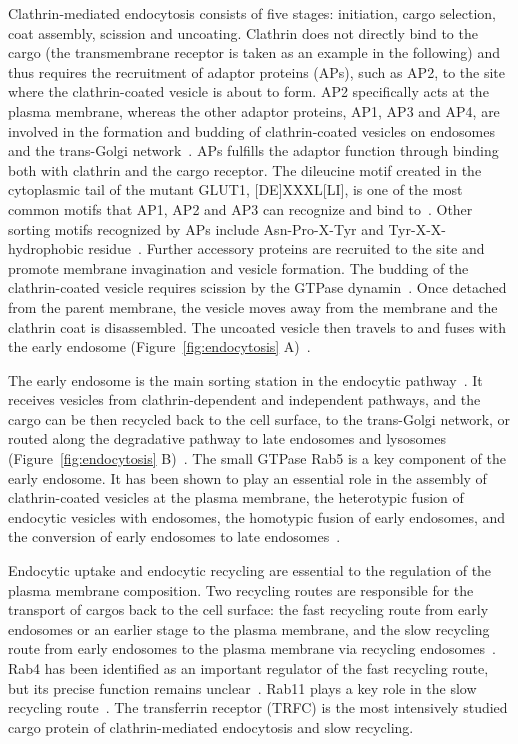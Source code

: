 Clathrin-mediated endocytosis consists of five stages: initiation, cargo selection, coat assembly, scission and uncoating. Clathrin does not directly bind to the cargo (the transmembrane receptor is taken as an example in the following) and thus requires the recruitment of adaptor proteins (APs), such as AP2, to the site where the clathrin-coated vesicle is about to form. AP2 specifically acts at the plasma membrane, whereas the other adaptor proteins, AP1, AP3 and AP4, are involved in the formation and budding of clathrin-coated vesicles on endosomes and the trans-Golgi network~\cite{Hirst2,McMahon}. APs fulfills the adaptor function through binding both with clathrin and the cargo receptor. The dileucine motif created in the cytoplasmic tail of the mutant GLUT1, [DE]XXXL[LI], is one of the most common motifs that AP1, AP2 and AP3 can recognize and bind to~\cite{Humphries}. Other sorting motifs recognized by APs include Asn-Pro-X-Tyr and Tyr-X-X-hydrophobic residue~\cite{McNiven}. Further accessory proteins are recruited to the site and promote membrane invagination and vesicle formation. The budding of the clathrin-coated vesicle requires scission by the GTPase dynamin~\cite{McMahon}. Once detached from the parent membrane, the vesicle moves away from the membrane and the clathrin coat is disassembled. The uncoated vesicle then travels to and fuses with the early endosome (Figure~\ref{fig:endocytosis} A)~\cite{McMahon}.

The early endosome is the main sorting station in the endocytic pathway~\cite{Huotari}. It receives vesicles from clathrin-dependent and independent pathways, and the cargo can be then recycled back to the cell surface, to the trans-Golgi network, or routed along the degradative pathway to late endosomes and lysosomes (Figure~\ref{fig:endocytosis} B)~\cite{Huotari}. The small GTPase Rab5 is a key component of the early endosome. It has been shown to play an essential role in the assembly of clathrin-coated vesicles at the plasma membrane, the heterotypic fusion of endocytic vesicles with endosomes, the homotypic fusion of early endosomes, and the conversion of early endosomes to late endosomes~\cite{Stenmark,Huotari}. 

Endocytic uptake and endocytic recycling are essential to the regulation of the plasma membrane composition. Two recycling routes are responsible for the transport of cargos back to the cell surface: the fast recycling route from early endosomes or an earlier stage to the plasma membrane, and the slow recycling route from early endosomes to the plasma membrane via recycling endosomes~\cite{Grant}. Rab4 has been identified as an important regulator of the fast recycling route, but its precise function remains unclear~\cite{Grant}. Rab11 plays a key role in the slow recycling route~\cite{Grant}. The transferrin receptor (TRFC) is the most intensively studied cargo protein of clathrin-mediated endocytosis and slow recycling. 

